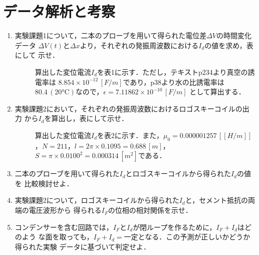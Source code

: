 
\section{データ解析と考察}

\begin{enumerate}
    \item 実験課題1について，二本のプローブを用いて得られた電位差$\Delta V$の時間変化データ
    $\Delta V(t)$と$\Delta x$より，それぞれの発振周波数における$I_d$の値を求め，表にして
    示せ．
    \begin{description}
        \item[] 算出した変位電流$I_d$を表1に示す．ただし，テキストp234より真空の誘電率は
        $8.854\times 10^{-12}\,[\si{F/m}]$であり，p38より水の比誘電率は
        $80.4\,(20\si{\celsius})$なので，$\epsilon=7.11862\times 10^{-10}\,[\si{F/m}]$
        として算出する．

    \end{description}

    \item 実験課題2において，それぞれの発振周波数におけるロゴスキーコイルの出力
    から$I_d$を算出し，表にして示せ．
    \begin{description}
        \item[] 算出した変位電流$I_d$を表2に示す．また，$\mu_0=0.000001257\,[\si{[H/m]}]$
        ，$N=211$，$l=2\pi\times 0.1095=0.688\,[\si{m}]$，
        $S=\pi\times 0.0100^2=0.000314\,[\si{m^2}]$である．
        
    \end{description}

    \item 二本のプローブを用いて得られた$I_d$とロゴスキーコイルから得られた$I_d$の値を
    比較検討せよ．
    \begin{description}
        \item[] 
    \end{description}
    
    \item 実験課題2について，ロゴスキーコイルから得られた$I_d$と，セメント抵抗の両端の電圧波形から
    得られる$I_F$の位相の相対関係を示せ．
    \begin{description}
        \item[] 
    \end{description}

    \item コンデンサーを含む回路では，$I_F$と$I_d$が閉ループを作るために，$I_F+I_d$はどのよう
    な面を取っても，$I_F+I_d=一定$となる．この予測が正しいかどうか得られた実験
    データに基づいて判定せよ．
    \begin{description}
        \item[] 
    \end{description}
    
\end{enumerate}